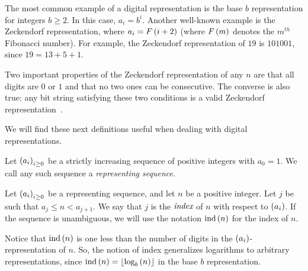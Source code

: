 \documentclass[english,12pt]{article}
\newcommand{\seq}{\p}
\DeclareMathOperator{\ind}{ind}
\begin{document}
The most common example of a digital representation is the base $b$ representation for integers $b\geq2$.  In this case, $a_i=b^i$.  Another well-known example is the Zeckendorf representation, where $a_i=F\left(i+2\right)$ (where $F\left(m\right)$ denotes the $m^{th}$ Fibonacci number).  For example, the Zeckendorf representation of $19$ is $101001$, since $19=13+5+1$.

Two important properties of the Zeckendorf representation of any $n$ are that all digits are $0$ or $1$ and that no two ones can be consecutive.  The converse is also true: any bit string satisfying these two conditions is a valid Zeckendorf representation~\cite{zeck}.

We will find these next definitions useful when dealing with digital representations.
\begin{defin}
Let $\seq{a_i}_{i\geq0}$ be a strictly increasing sequence of positive integers with $a_0=1$.  We call any such sequence a \emph{representing sequence}.
\end{defin}
\begin{defin}
Let $\seq{a_i}_{i\geq0}$ be a representing sequence, and let $n$ be a positive integer.  Let $j$ be such that $a_j\leq n<a_{j+1}$.  We say that $j$ is the $\emph{index}$ of $n$ with respect to $\seq{a_i}$.  If the sequence is unambiguous, we will use the notation $\ind\p{n}$ for the index of $n$.
\end{defin}
Notice that $\ind\p{n}$ is one less than the number of digits in the $\seq{a_i}$-representation of $n$.  So, the notion of index generalizes logarithms to arbitrary representations, since $\ind\p{n}=\fl{\log_b\p{n}}$ in the base $b$ representation.
\end{document}

